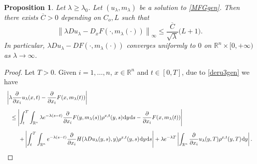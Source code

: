 \documentclass{amsart}
\newtheorem{prop}[thm]{Proposition}
\theoremstyle{remark}
\theoremstyle{definition}
\theoremstyle{Claim}
\newcommand{\R}{\mathbb{R}}
\newcommand{\dd}{\hspace{0.7pt}{\rm d}}
\theoremstyle{plain}
\begin{document}
\begin{prop}\label{convunifgen}
		Let $\lambda\ge\lambda_0$. Let $(u_\lambda,m_\lambda)$ be a solution to \eqref{MFGgen}. Then there exists $\overline C>0$ depending on $C_o,L$ such that
		\begin{equation}\label{stimaunif}
			\left\| \lambda D u_\lambda-D_xF(\cdot,m_\lambda(\cdot))\right\|_\infty \le \frac{\overline{C}}{\sqrt{\lambda}}\big(L+1\big).
		\end{equation}
		In particular, $\lambda Du_\lambda-DF(\cdot,m_\lambda(\cdot))$ converges uniformly to $0$ on $\mathbb{R}^n\times [0,+\infty)$ as $\lambda \to \infty$.
	\end{prop}
	\begin{proof}
		Let $T>0$. Given $i=1,\dots,n$, $x\in \mathbb{R}^n$ and $t\in [0,T]$, due to \eqref{deru3gen} we have
		\begin{equation}\label{lambdaDu-DFgen}
			\begin{array}{l}
				\vspace{0.3cm}\displaystyle{\left\lvert \lambda \frac{\partial}{\partial x_i}u_\lambda(x,t)-\frac{\partial}{\partial x_i}F(x,m_\lambda(t))\right\rvert}\\
				\vspace{0.3cm}\displaystyle{\hspace{0.3cm}\leq \left\lvert\int_{t}^{T}\int_{\R^n}\lambda e^{-\lambda (s-t)} \frac{\partial}{\partial x_i} F(y,m_\lambda(s)) \rho^{x,t}(y,s)\dd y\dd s-\frac{\partial}{\partial x_i}F(x,m_\lambda(t))\right\rvert}\\
				\displaystyle{\hspace{0.8cm}+\left\lvert\int_{t}^{T}\int_{\R^n}e^{-\lambda (s-t)} \frac{\partial}{\partial x_i} H(\lambda Du_\lambda(y,s),y) \rho^{x,t}(y,s)\dd y\dd s\right\rvert+\lambda e^{-\lambda T}\left\lvert\int_{\mathbb{R}^n}\frac{\partial}{\partial x_i}u_\lambda(y,T)\rho^{x, t}(y,T)\dd y\right\rvert.}
				\end{array}
		\end{equation}
		

\end{proof}
\end{document}
